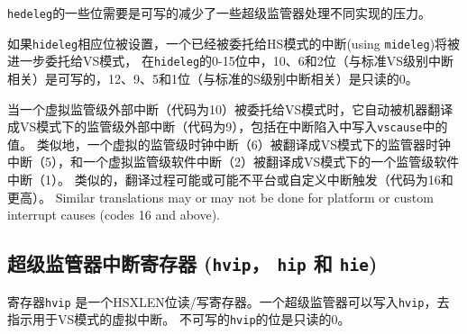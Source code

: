 \begin{commentary}
  {\tt hedeleg}的一些位需要是可写的减少了一些超级监管器处理不同实现的压力。
\end{commentary}

如果{\tt hideleg}相应位被设置，一个已经被委托给HS模式的中断(using {\tt mideleg})将被进一步委托给VS模式，
在{\tt hideleg}的0-15位中，10、6和2位（与标准VS级别中断相关）是可写的，12、9、5和1位（与标准的S级别中断相关）是只读的0。

当一个虚拟监管级外部中断（代码为10）被委托给VS模式时，它自动被机器翻译成VS模式下的监管级外部中断（代码为9），包括在中断陷入中写入{\tt vscause}中的值。
类似地，一个虚拟的监管级时钟中断（6）被翻译成VS模式下的监管器时钟中断（5），和一个虚拟监管级软件中断（2）被翻译成VS模式下的一个监管级软件中断（1）。
类似的，翻译过程可能或可能不平台或自定义中断触发（代码为16和更高）。
Similar translations may or may not be done for platform or custom
interrupt causes (codes 16 and above).

\subsection{超级监管器中断寄存器 ({\tt hvip}， {\tt hip} 和 {\tt hie})}
\label{sec:hinterruptregs}

寄存器{\tt hvip} 是一个HSXLEN位读/写寄存器。一个超级监管器可以写入{\tt hvip}，去指示用于VS模式的虚拟中断。
不可写的{\tt hvip}的位是只读的0。


